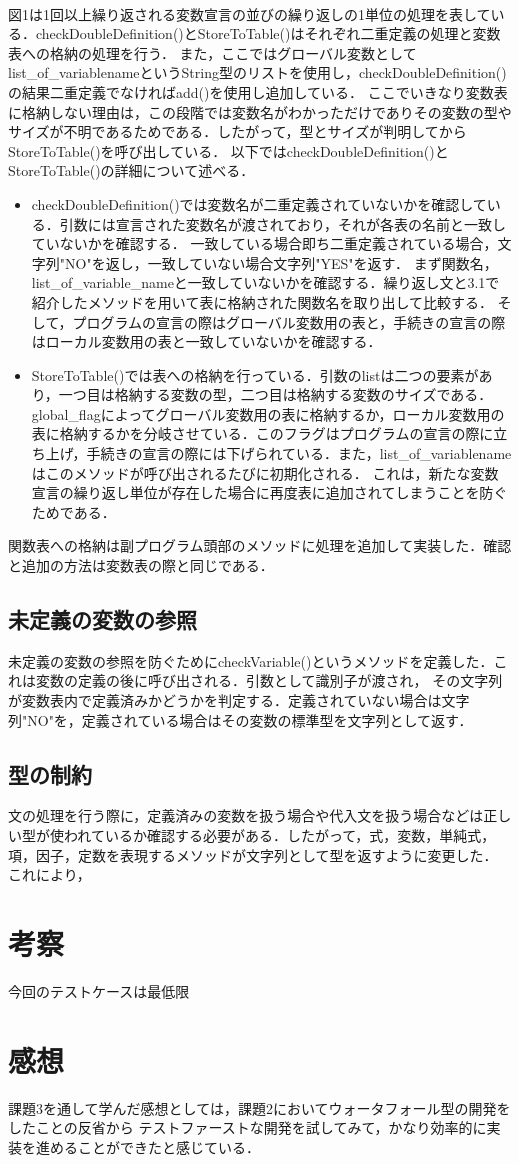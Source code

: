 \documentclass[dvipdfmx]{jarticle}
\begin{document}
  \\図1は1回以上繰り返される変数宣言の並びの繰り返しの1単位の処理を表している．checkDoubleDefinition()とStoreToTable()はそれぞれ二重定義の処理と変数表への格納の処理を行う．
また，ここではグローバル変数としてlist\_of\_variablenameというString型のリストを使用し，checkDoubleDefinition()の結果二重定義でなければadd()を使用し追加している．
ここでいきなり変数表に格納しない理由は，この段階では変数名がわかっただけでありその変数の型やサイズが不明であるためである．したがって，型とサイズが判明してからStoreToTable()を呼び出している．
以下ではcheckDoubleDefinition()とStoreToTable()の詳細について述べる．
\begin{itemize}
  \item checkDoubleDefinition()では変数名が二重定義されていないかを確認している．引数には宣言された変数名が渡されており，それが各表の名前と一致していないかを確認する．
  一致している場合即ち二重定義されている場合，文字列"NO"を返し，一致していない場合文字列"YES"を返す．
  まず関数名，list\_of\_variable\_nameと一致していないかを確認する．繰り返し文と3.1で紹介したメソッドを用いて表に格納された関数名を取り出して比較する．
  そして，プログラムの宣言の際はグローバル変数用の表と，手続きの宣言の際はローカル変数用の表と一致していないかを確認する．
  \item StoreToTable()では表への格納を行っている．引数のlistは二つの要素があり，一つ目は格納する変数の型，二つ目は格納する変数のサイズである．
  global\_flagによってグローバル変数用の表に格納するか，ローカル変数用の表に格納するかを分岐させている．このフラグはプログラムの宣言の際に立ち上げ，手続きの宣言の際には下げられている．また，list\_of\_variablenameはこのメソッドが呼び出されるたびに初期化される．
  これは，新たな変数宣言の繰り返し単位が存在した場合に再度表に追加されてしまうことを防ぐためである．
\end{itemize}
関数表への格納は副プログラム頭部のメソッドに処理を追加して実装した．確認と追加の方法は変数表の際と同じである．
\subsection{未定義の変数の参照}
未定義の変数の参照を防ぐためにcheckVariable()というメソッドを定義した．これは変数の定義の後に呼び出される．引数として識別子が渡され，
その文字列が変数表内で定義済みかどうかを判定する．定義されていない場合は文字列"NO"を，定義されている場合はその変数の標準型を文字列として返す．
\subsection{型の制約}
文の処理を行う際に，定義済みの変数を扱う場合や代入文を扱う場合などは正しい型が使われているか確認する必要がある．したがって，式，変数，単純式，項，因子，定数を表現するメソッドが文字列として型を返すように変更した．
これにより，
\section{考察}
今回のテストケースは最低限
\section{感想}
課題3を通して学んだ感想としては，課題2においてウォータフォール型の開発をしたことの反省から
テストファーストな開発を試してみて，かなり効率的に実装を進めることができたと感じている．
\begin{thebibliography}{1}
\end{thebibliography}
\end{document}
